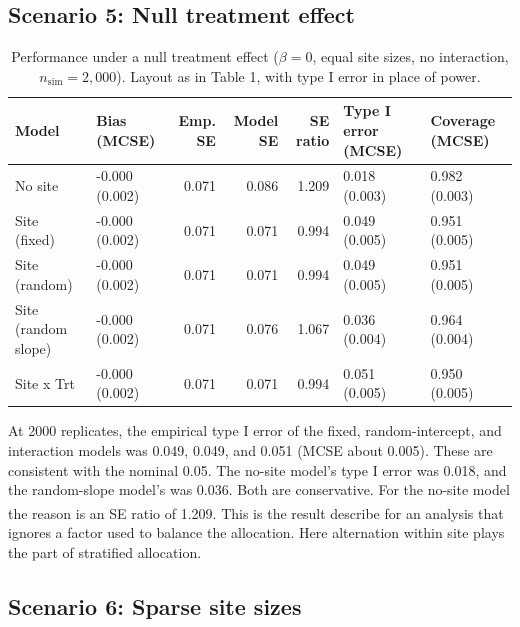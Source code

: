 \documentclass[
  11pt,
]{article}
\begin{document}
\subsection{Scenario 5: Null treatment effect}\label{scenario-5-null-treatment-effect}

\begin{table}[!h]
\centering
\caption{\label{tab:tab-null}Performance under a null treatment effect ($\beta = 0$, equal site sizes, no interaction, $n_{\mathrm{sim}} = 2{,}000$). Layout as in Table 1, with type I error in place of power.}
\centering
\fontsize{8}{10}\selectfont
\begin{tabular}[t]{llrrrll}
\toprule
Model & Bias (MCSE) & Emp. SE & Model SE & SE ratio & Type I error (MCSE) & Coverage (MCSE)\\
\midrule
No site & -0.000 (0.002) & 0.071 & 0.086 & 1.209 & 0.018 (0.003) & 0.982 (0.003)\\
Site (fixed) & -0.000 (0.002) & 0.071 & 0.071 & 0.994 & 0.049 (0.005) & 0.951 (0.005)\\
Site (random) & -0.000 (0.002) & 0.071 & 0.071 & 0.994 & 0.049 (0.005) & 0.951 (0.005)\\
Site (random slope) & -0.000 (0.002) & 0.071 & 0.076 & 1.067 & 0.036 (0.004) & 0.964 (0.004)\\
Site x Trt & -0.000 (0.002) & 0.071 & 0.071 & 0.994 & 0.051 (0.005) & 0.950 (0.005)\\
\bottomrule
\end{tabular}
\end{table}

At 2000 replicates, the empirical type I error of the
fixed, random-intercept, and interaction models was
0.049,
0.049, and
0.051 (MCSE about
0.005). These are
consistent with the nominal 0.05. The no-site model's type I error
was 0.018, and the random-slope
model's was 0.036. Both are
conservative. For the no-site model the reason is an SE ratio of
1.209. This is the result\textsuperscript{} describe for an analysis that
ignores a factor used to balance the allocation. Here alternation
within site plays the part of stratified allocation.

\subsection{Scenario 6: Sparse site sizes}\label{scenario-6-sparse-site-sizes}
\end{document}

